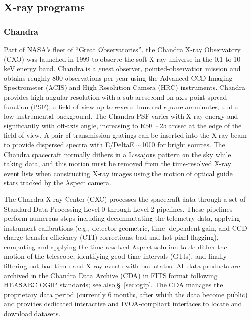 \documentclass[11pt,a4paper]{ivoa}
\begin{document}
\subsection{X-ray programs}

\subsubsection{Chandra}\label{sec:chandra}

Part of NASA's fleet of ``Great Observatories'', the Chandra X-ray Observatory (CXO) was launched in 1999 to observe
the soft X-ray universe in the 0.1 to 10 keV energy band. Chandra is a guest observer, pointed-observation mission and
obtains roughly 800 observations per year using the Advanced CCD Imaging Spectrometer (ACIS) and High Resolution Camera
(HRC) instruments. Chandra provides high angular resolution with a sub-arcsecond on-axis point spread function (PSF),
a field of view up to several hundred square arcminutes, and a low instrumental background. The Chandra PSF varies with
X-ray energy and significantly with off-axis angle, increasing to R50 $\sim$25 arcsec at the edge of the field of view.
A pair of transmission gratings can be inserted into the X-ray beam to provide dispersed spectra with E/DeltaE $\sim$1000
for bright sources. The Chandra spacecraft normally dithers in a Lissajous pattern on the sky while taking data, and
this motion must be removed from the time-resolved X-ray event lists when constructing X-ray images using the motion
of optical guide stars tracked by the Aspect camera.

The Chandra X-ray Center (CXC) processes the spacecraft data through a set of Standard Data Processing Level 0 through
Level 2 pipelines. These pipelines perform numerous steps including decommutating the telemetry data,
applying instrument calibrations (e.g., detector geometric, time- dependent gain, and CCD charge transfer efficiency
(CTI) corrections, bad and hot pixel flagging), computing and applying the time-resolved Aspect solution to de-dither
the motion of the telescope, identifying good time intervals (GTIs), and finally filtering out bad times and X-ray events
with bad status. All data products are archived in the Chandra Data Archive (CDA) in FITS format following HEASARC
OGIP standards;  see also \S~\ref{sec:ogip}. The CDA manages the proprietary data period (currently 6 months, after
which the data become public) and provides dedicated interactive and IVOA-compliant interfaces to locate and download
datasets.
\end{document}
